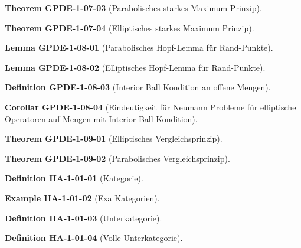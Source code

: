 \documentclass[10pt, letterpaper]{article}
\newcommand{\CustomHeading}[3]{%
  \par\medskip\noindent%
  \textbf{#1 #2} \textnormal{(#3)}.\enskip%
}
\newenvironment{DEF}[2]{\CustomHeading{Definition}{#1}{#2}}{}
\newenvironment{THEO}[2]{\CustomHeading{Theorem}{#1}{#2}}{}
\newenvironment{LEM}[2]{\CustomHeading{Lemma}{#1}{#2}}{}
\newenvironment{KORO}[2]{\CustomHeading{Corollar}{#1}{#2}}{}
\newenvironment{EXA}[2]{\CustomHeading{Example}{#1}{#2}}{}
\begin{document}
\begin{THEO}{GPDE-1-07-03}{Parabolisches starkes Maximum Prinzip}
\end{THEO}

\begin{THEO}{GPDE-1-07-04}{Elliptisches starkes Maximum Prinzip}
\end{THEO}

\begin{LEM}{GPDE-1-08-01}{Parabolisches Hopf-Lemma für Rand-Punkte}
\end{LEM}

\begin{LEM}{GPDE-1-08-02}{Elliptisches Hopf-Lemma für Rand-Punkte}
\end{LEM}

\begin{DEF}{GPDE-1-08-03}{Interior Ball Kondition an offene Mengen}
\end{DEF}

\begin{KORO}{GPDE-1-08-04}{Eindeutigkeit für Neumann Probleme für elliptische Operatoren auf Mengen mit Interior Ball Kondition}
\end{KORO}

\begin{THEO}{GPDE-1-09-01}{Elliptisches Vergleichsprinzip}
\end{THEO}

\begin{THEO}{GPDE-1-09-02}{Parabolisches Vergleichsprinzip}
\end{THEO}

\begin{DEF}{HA-1-01-01}{Kategorie}
\end{DEF}

\begin{EXA}{HA-1-01-02}{Exa Kategorien}
\end{EXA}

\begin{DEF}{HA-1-01-03}{Unterkategorie}
\end{DEF}

\begin{DEF}{HA-1-01-04}{Volle Unterkategorie}
\end{DEF}
\end{document}
